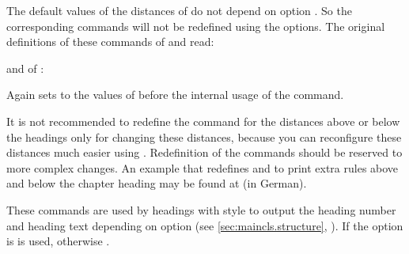 The default values of the distances of  do not depend on option
. So the corresponding commands will not be redefined using
the options. The original definitions of these commands of 
and  read:
\begin{lstcode}
  \newcommand*{\partheadstartvskip}{%
    \null\vskip-\baselineskip\vskip\@tempskipa
  }
  \newcommand*{\partheadmidvskip}{%
    \par\nobreak
    \vskip\@tempskipa
  }
  \newcommand*{\partheadendvskip}{%
    \vskip\@tempskipa\newpage
  }
\end{lstcode}
and of :
\begin{lstcode}
  \newcommand*{\partheadstartvskip}{%
    \addvspace{\@tempskipa}%
  }
  \newcommand*{\partheadmidvskip}{%
    \par\nobreak
  }
  \newcommand*{\partheadendvskip}{%
    \vskip\@tempskipa
  }
\end{lstcode}
Again  sets  to the
values of  before
the internal usage of the command.

It is not recommended to redefine the command for the
distances above or below the headings only for changing these distances,
because you can reconfigure these distances much easier using
. Redefinition of the commands should be
reserved to more complex changes. An  example that
redefines  and  to
print extra rules above and below the chapter heading may be found at
\cite{homepage} (in German).%
%
\EndIndexGroup


\begin{Declaration}
\end{Declaration}
These commands are used
by headings with style  to output the heading number and
heading text depending on option
%
 (see \autoref{sec:maincls.structure},
). If the option is
  is used, otherwise
.

